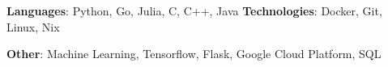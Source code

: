 \textbf{Languages}{: Python, Go, Julia, C, C++, Java}
\hfill
\textbf{Technologies}{: Docker, Git, Linux, Nix}
\vspace{3pt}

\textbf{Other}{: Machine Learning, Tensorflow, Flask, Google Cloud Platform, SQL}
